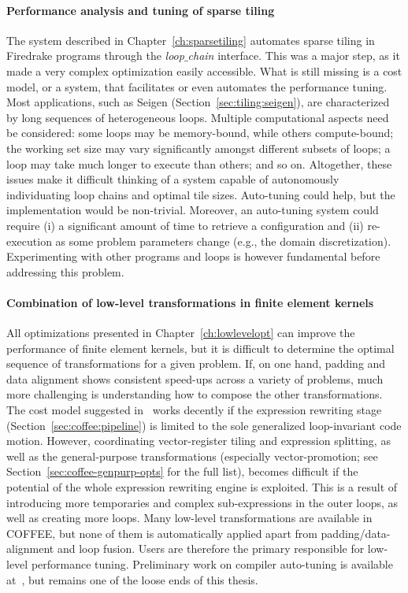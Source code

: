 \paragraph{Performance analysis and tuning of sparse tiling}
The system described in Chapter~\ref{ch:sparsetiling} automates sparse tiling in Firedrake programs through the {\em loop$\_$chain} interface. This was a major step, as it made a very complex optimization easily accessible. What is still missing is a cost model, or a system, that facilitates or even automates the performance tuning. Most applications, such as Seigen (Section~\ref{sec:tiling:seigen}), are characterized by long sequences of heterogeneous loops. Multiple computational aspects need be considered: some loops may be memory-bound, while others compute-bound; the working set size may vary significantly amongst different subsets of loops; a loop may take much longer to execute than others; and so on. Altogether, these issues make it difficult thinking of a system capable of autonomously individuating loop chains and optimal tile sizes. Auto-tuning could help, but the implementation would be non-trivial. Moreover, an auto-tuning system could require (i) a significant amount of time to retrieve a configuration and (ii) re-execution as some problem parameters change (e.g., the domain discretization). Experimenting with other programs and loops is however fundamental before addressing this problem.


\paragraph{Combination of low-level transformations in finite element kernels}
All optimizations presented in Chapter~\ref{ch:lowlevelopt} can improve the performance of finite element kernels, but it is difficult to determine the optimal sequence of transformations for a given problem. If, on one hand, padding and data alignment shows consistent speed-ups across a variety of problems, much more challenging is understanding how to compose the other transformations. The cost model suggested in~\cite{Luporini-coffee} works decently if the expression rewriting stage (Section~\ref{sec:coffee:pipeline}) is limited to the sole generalized loop-invariant code motion. However, coordinating vector-register tiling and expression splitting, as well as the general-purpose transformations (especially vector-promotion; see Section~\ref{sec:coffee-genpurp-opts} for the full list), becomes difficult if the potential of the whole expression rewriting engine is exploited. This is a result of introducing more temporaries and complex sub-expressions in the outer loops, as well as creating more loops. Many low-level transformations are available in COFFEE, but none of them is automatically applied apart from padding/data-alignment and loop fusion. Users are therefore the primary responsible for low-level performance tuning. Preliminary work on compiler auto-tuning is available at~\citep{coffee-code}, but remains one of the loose ends of this thesis.


